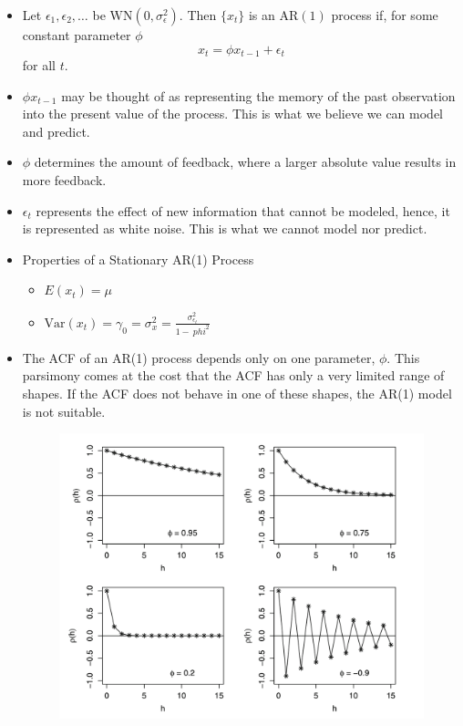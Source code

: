 \documentclass[11pt]{article}
\begin{document}
\begin{itemize}
    \item Let $\epsilon_1, \epsilon_2, \ldots$ be $\text{WN}(0, \sigma_{\epsilon}^{2})$. Then 
    $\{x_t\}$ is an $\text{AR}(1)$ process if, for some constant parameter $\phi$
    \[ x_t = \phi x_{t-1} + \epsilon_t \]
    for all $t$.
    \item $\phi x_{t-1}$ may be thought of as representing the memory of the past observation
    into the present value of the process. This is what we believe we can model and predict.
    \item $\phi$ determines the amount of feedback, where a larger absolute value results in 
    more feedback.
    \item $\epsilon_t$ represents the effect of new information that cannot be modeled, hence,
    it is represented as white noise. This is what we cannot model nor predict. 
    \item Properties of a Stationary AR(1) Process 
    \begin{itemize}
        \item $E(x_t) = \mu$ 
        \item $\text{Var}(x_t)= \gamma_0 = \sigma_x^2 = \frac{\sigma_{\epsilon_t}^{2}}{1-\
        phi^2}$
    \end{itemize}
    \item The ACF of an AR(1) process depends only on one parameter, $\phi$. This parsimony 
    comes at the cost that the ACF has only a very limited range of shapes. If the ACF does not
    behave in one of these shapes, the AR(1) model is not suitable.
    \begin{figure}[H] 
        \centering 
        \includegraphics[width=5in]{imgs/ar1_acf.png}

\end{figure}
\end{itemize}
\end{document}
